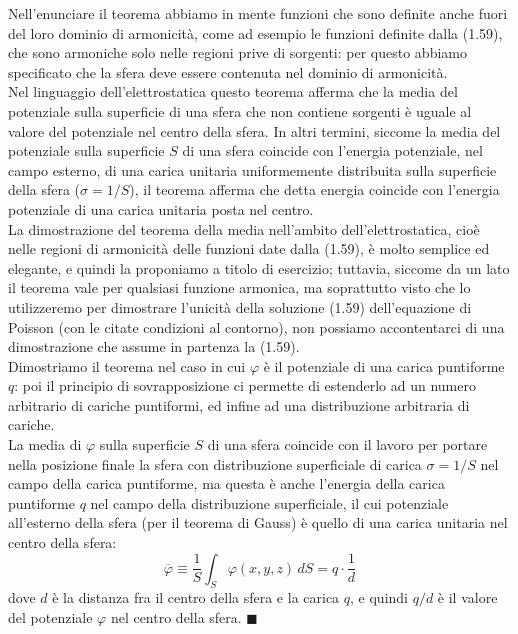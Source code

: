 Nell'enunciare il teorema abbiamo in mente funzioni che sono definite anche
fuori del loro dominio di armonicit\`a, come ad esempio le funzioni definite
dalla (1.59), che sono armoniche solo nelle regioni prive di sorgenti: per
questo abbiamo specificato che la
sfera deve essere contenuta nel dominio di armonicit\`a.\\
Nel linguaggio dell'elettrostatica questo teorema afferma che la media del
potenziale sulla superficie di una sfera che non contiene sorgenti \`e uguale al
valore del potenziale nel centro della sfera. In altri termini, siccome la media
del potenziale sulla superficie $S$ di una sfera coincide con l'energia
potenziale, nel campo esterno, di una carica unitaria uniformemente distribuita
sulla superficie della sfera ($\sigma=1/S$), il teorema afferma che detta
energia coincide con l'energia potenziale di una carica unitaria posta nel
centro.\\
La dimostrazione del teorema della media nell'ambito dell'elettrostatica, cio\`e
nelle regioni di armonicit\`a delle funzioni date dalla (1.59), \`e molto
semplice ed elegante, e quindi la proponiamo a titolo di esercizio; tuttavia,
siccome da un lato il teorema vale per qualsiasi funzione armonica, ma
soprattutto visto che lo utilizzeremo per dimostrare l'unicit\`a della soluzione
(1.59) dell'equazione di Poisson (con le citate condizioni al contorno), non
possiamo accontentarci di una dimostrazione che assume in partenza la (1.59).\\
Dimostriamo il teorema nel caso in cui $\varphi$ \`e il potenziale di una carica
puntiforme $q$: poi il principio di sovrapposizione ci permette di estenderlo ad
un numero arbitrario di cariche puntiformi, ed infine ad una distribuzione
arbitraria di cariche.\\
La media di $\varphi$ sulla superficie $S$ di una sfera coincide con il lavoro
per portare nella posizione finale la sfera con distribuzione superficiale di
carica $\sigma=1/S$ nel campo della carica puntiforme, ma questa \`e anche
l'energia della carica puntiforme $q$ nel campo della distribuzione
superficiale, il cui potenziale all'esterno della sfera (per il teorema di
Gauss) \`e quello di una carica unitaria nel centro della sfera:
\begin{equation}
  \overline\varphi\equiv\frac1S\int_S\varphi(x,y,z)\,dS=q\cdot\frac1d
  \tag{1.100}
\end{equation}
dove $d$ \`e la distanza fra il centro della sfera e la carica $q$, e quindi
$q/d$ \`e il valore del potenziale $\varphi$ nel centro della sfera.
$\blacksquare$


